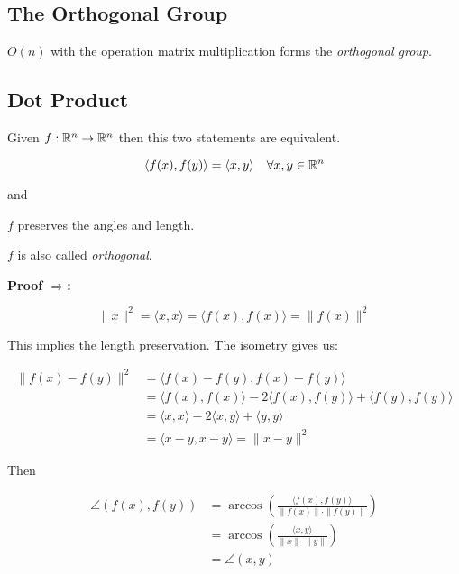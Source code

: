 \QED

\subsection{The Orthogonal Group}

\(O(n)\) with the operation matrix multiplication forms the \emph{orthogonal group}.
\vspace{\baselineskip}

\subsection{Dot Product}

Given \(f: \mathbb{R}^n \to \mathbb{R}^n\) then this two statements are equivalent.

\[
    \langle f(x), f(y) \rangle = \langle x, y \rangle \quad \forall x,y \in \mathbb{R}^n
\]

and 
\vspace{\baselineskip}

\(f\) preserves the angles and length.
\vspace{\baselineskip}

\(f\) is also called \emph{orthogonal}.
\vspace{\baselineskip}

\textbf{Proof \(\Rightarrow\):}
 
\[
    \|x\|^2 = \langle x, x \rangle = \langle f(x), f(x) \rangle = \|f(x)\|^2
\]

This implies the length preservation. The isometry gives us:

\begin{align*}
    \|f(x) - f(y)\|^2 
    &= \langle f(x) - f(y), f(x) - f(y) \rangle \\
    &= \langle f(x), f(x) \rangle - 2\langle f(x), f(y) \rangle + \langle f(y), f(y) \rangle \\
    &= \langle x, x \rangle - 2\langle x, y \rangle + \langle y, y \rangle \\
    &= \langle x - y, x - y \rangle = \|x - y\|^2
\end{align*}

Then

\begin{align*}
    \angle(f(x), f(y)) 
    &= \arccos\left( \frac{\langle f(x), f(y) \rangle}{\|f(x)\| \cdot \|f(y)\|} \right) \\
    &= \arccos\left( \frac{\langle x, y \rangle}{\|x\| \cdot \|y\|} \right) \\
    &= \angle(x, y)
\end{align*}

